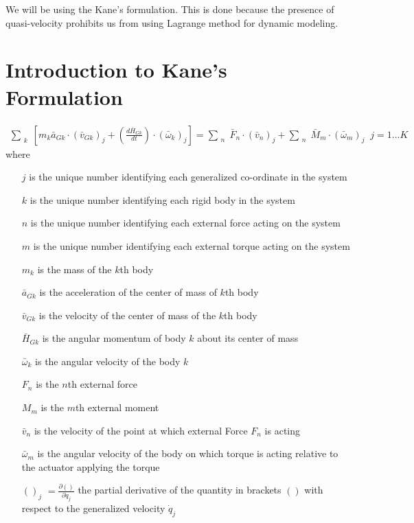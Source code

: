 \documentclass[a4paper,10pt]{article}
\begin{document}
We will be using the Kane's formulation. This is done because the presence of quasi-velocity prohibits us from using Lagrange method for dynamic modeling.

\section{Introduction to Kane's Formulation}
\begin{align}
 \sum_{\substack{k}} \left[ m_k \bar{a}_{Gk} \cdot \left(\bar{v}_{Gk}\right)_j + \left( \frac{d\bar{H}_{Gk}}{dt} 
 \right) \cdot \left( \bar\omega_k \right)_j \right] = \sum_{\substack{n}}  \bar{F}_n \cdot \left( \bar{v}_n \right)_j 
 + \sum_{\substack{n}}  \bar{M}_m \cdot \left( \bar{\omega}_m \right)_j \;\; j=1 ... K \label{kanes}
\end{align}
where 
\begin{itemize}[label={}]
\item[$j$] is the unique number identifying each generalized co-ordinate in the system
\item[$k$] is the unique number identifying each rigid body in the system
\item[$n$] is the unique number identifying each external force acting on the system
\item[$m$] is the unique number identifying each external torque acting on the system
\item[$m_k$] is the mass of the $k$th body
\item[$\bar{a}_{Gk}$] is the acceleration of the center of mass of $k$th body
\item[$\bar{v}_{Gk}$] is the velocity of the center of mass of the $k$th body
\item[$\bar{H}_{Gk}$] is the angular momentum of body $k$ about its center of mass
\item[$\bar{\omega}_{k}$] is the angular velocity of the body $k$
\item[$F_n$] is the $n$th external force
\item[$M_m$] is the $m$th external moment
\item[$\bar{v}_{n}$] is the velocity of the point at which external Force $F_n$ is acting
\item[$\bar{\omega}_{m}$] is the angular velocity of the body on which torque is acting relative to the actuator applying the torque
\item[$()_j$] $=\frac{\partial ()}{\partial \dot{q}_j}$ the partial derivative of the quantity in brackets $()$ with respect to the generalized
velocity $\dot{q}_j$
\end{itemize}
\end{document}
